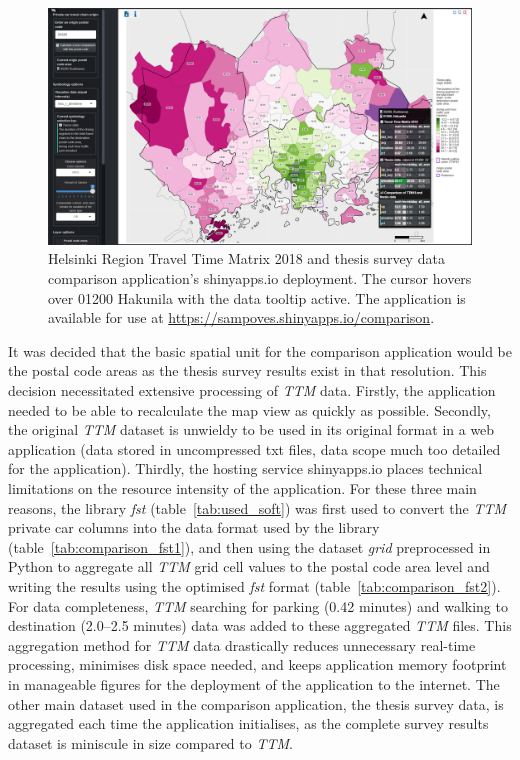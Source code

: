 \begin{figure}[H]%
    \includegraphics[width=\textwidth]{images/shinyapps_comparison.png}
    \caption[Comparison application screenshot]{Helsinki Region Travel Time Matrix 2018 and thesis survey data comparison application's shinyapps.io deployment. The cursor hovers over 01200 Hakunila with the data tooltip active. The application is available for use at \textcolor{blue}{\url{https://sampoves.shinyapps.io/comparison}}.}%
    \label{fig:shinyapps_comparison}%
\end{figure}

It was decided that the basic spatial unit for the comparison application would be the postal code areas as the thesis survey results exist in that resolution. This decision necessitated extensive processing of \textit{TTM} data. Firstly, the application needed to be able to recalculate the map view as quickly as possible. Secondly, the original \textit{TTM} dataset is unwieldy to be used in its original format in a web application (data stored in uncompressed txt files, data scope much too detailed for the application). Thirdly, the hosting service shinyapps.io places technical limitations on the resource intensity of the application. For these three main reasons, the library \textit{fst} (table~\ref{tab:used_soft}) was first used to convert the \textit{TTM} private car columns into the data format used by the library (table~\ref{tab:comparison_fst1}), and then using the dataset \textit{grid} preprocessed in Python to aggregate all \textit{TTM} grid cell values to the postal code area level and writing the results using the optimised \textit{fst} format (table~\ref{tab:comparison_fst2}). For data completeness, \textit{TTM} searching for parking (0.42 minutes) and walking to destination (2.0--2.5 minutes) data was added to these aggregated \textit{TTM} files. This aggregation method for \textit{TTM} data drastically reduces unnecessary real-time processing, minimises disk space needed, and keeps application memory footprint in manageable figures for the deployment of the application to the internet. The other main dataset used in the comparison application, the thesis survey data, is aggregated each time the application initialises, as the complete survey results dataset is miniscule in size compared to \textit{TTM}.

